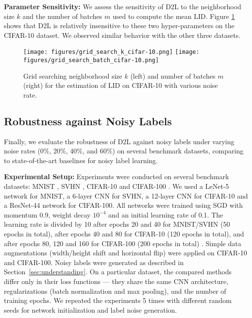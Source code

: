 \documentclass{article}
\begin{document}

\textbf{Parameter Sensitivity:} We assess the sensitivity of D2L to the neighborhood size $k$ and the number of batches $m$ used to compute the mean LID. Figure \ref{fig:tuning_k} shows that D2L is relatively insensitive to these two hyper-parameters on the CIFAR-10 dataset. We observed similar behavior with the other three datasets.

\begin{figure}[!t]
\centering
\small
\texttt{[image: figures/grid\_search\_k\_cifar-10.png]}
\texttt{[image: figures/grid\_search\_batch\_cifar-10.png]}
\caption{Grid searching neighborhood size $k$ (left) and number of batches $m$ (right) for the estimation of LID on CIFAR-10 with various noise rate.}
\label{fig:tuning_k}
\vspace{-0.2in}
\end{figure}

\subsection{Robustness against Noisy Labels}\label{sec:robustness_test}
Finally, we evaluate the robustness of D2L against noisy labels under varying noise rates (0\%, 20\%, 40\%, and 60\%) on several benchmark datasets, comparing to state-of-the-art baselines for noisy label learning.

\textbf{Experimental Setup:} Experiments were conducted on several benchmark datasets: MNIST \cite{lecun1998gradient}, SVHN \cite{netzer2011reading}, CIFAR-10 \cite{krizhevsky2009learning} and CIFAR-100 \cite{krizhevsky2009learning}. We used a LeNet-5 network \cite{lecun1998gradient} for MNIST, a 6-layer CNN for SVHN, a 12-layer CNN for CIFAR-10 and a ResNet-44 network \cite{he2016deep} for CIFAR-100. 
All networks were trained using SGD with momentum 0.9, weight decay $10^{-4}$ and an initial learning rate of 0.1. The learning rate is divided by 10 after epochs 20 and 40 for MNIST/SVHN (50 epochs in total), after epochs 40 and 80 for CIFAR-10 (120 epochs in total), and after epochs 80, 120 and 160 for CIFAR-100 (200 epochs in total) \cite{huang2016deep}. 
Simple data augmentations (width/height shift and horizontal flip) were applied on CIFAR-10 and CIFAR-100. Noisy labels were generated as described in Section~\ref{sec:understanding}. On a particular dataset, the compared methods differ only in their loss functions --- they share the same CNN architecture, regularizations (batch normalization and max pooling), and the number of training epochs. We repeated the experiments 5 times with different random seeds for network initialization and label noise generation.
\end{document}
